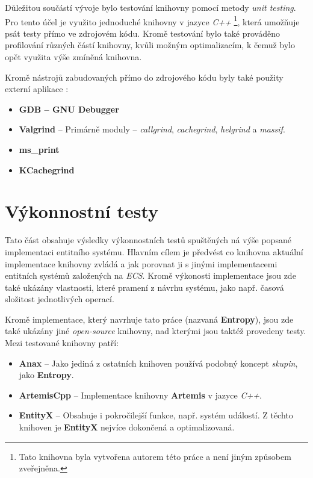 Důležitou součástí vývoje bylo testování knihovny pomocí metody \emph{unit testing}. Pro tento účel je využito jednoduché knihovny v jazyce \emph{C++} \footnote{Tato knihovna byla vytvořena autorem této práce a není jiným způsobem zveřejněna.}, která umožňuje psát testy přímo ve zdrojovém kódu. Kromě testování bylo také prováděno profilování různých částí knihovny, kvůli možným optimalizacím, k čemuž bylo opět využita výše zmíněná knihovna. 

Kromě nástrojů zabudovaných přímo do zdrojového kódu byly také použity externí aplikace : 
\begin{itemize}
	\item \textbf{GDB -- GNU Debugger}
	\item \textbf{Valgrind} -- Primárně moduly -- \emph{callgrind}, \emph{cachegrind}, \emph{helgrind} a \emph{massif}.
	\item \textbf{ms\_print}
	\item \textbf{KCachegrind}
\end{itemize}

\section{Výkonnostní testy}

Tato část obsahuje výsledky výkonnostních testů spuštěných ná výše popsané implementaci entitního systému. Hlavním cílem je předvést co knihovna aktuální implementace knihovny zvládá a jak porovnat ji s jinými implementacemi entitních systémů založených na \emph{ECS}. Kromě výkonosti implementace jsou zde také ukázány vlastnosti, které pramení z návrhu systému, jako např. časová složitost jednotlivých operací.

Kromě implementace, který navrhuje tato práce (nazvaná \textbf{Entropy}), jsou zde také ukázány jiné \emph{open-source} knihovny, nad kterými jsou taktéž provedeny testy. Mezi testované knihovny patří:
\begin{itemize}
	\item \textbf{Anax} \cite{Anax} -- Jako jediná z ostatních knihoven používá podobný koncept \emph{skupin}, jako \textbf{Entropy}.
	\item \textbf{ArtemisCpp} \cite{ArtemisCpp} -- Implementace knihovny \textbf{Artemis} \cite{ArtemisJava} v jazyce \emph{C++}.
	\item \textbf{EntityX} \cite{EntityX} -- Obsahuje i pokročilejší funkce, např. systém událostí. Z těchto knihoven je \textbf{EntityX} nejvíce dokončená a optimalizovaná.
\end{itemize}

